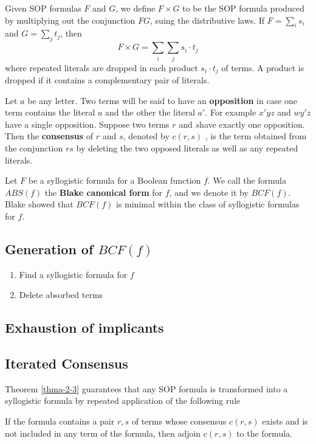 \documentclass[11pt]{article}
\begin{document}
Given SOP formulas \(F\) and \(G\), we define \(F\times G\) to be the SOP
formula produced by multiplying out the conjunction \(FG\), suing the
distributive laws. If \(F=\sum_is_i\) and \(G=\sum_jt_j\), then
\begin{equation*}
F\times G=\sum_i\sum_js_i\cdot t_j
\end{equation*}
where repeated literals are dropped in each product \(s_i\cdot t_j\) of
terms. A product is dropped if it contains a complementary pair of literals.

Let \(a\) be any letter. Two terms will be said to have an \textbf{opposition} in case
one term contains the literal \(a\) and the other the literal \(a'\). For
example \(x'yz\) and \(wy'z\) have a single opposition. Suppose two
terms \(r\) and \(s\)have exactly one opposition. Then the \textbf{consensus} of \(r\)
and \(s\), denoted by \(c(r,s)\) , is the term obtained from the
conjunction \(rs\) by deleting the two opposed literals as well as any
repeated literals.

Let \(F\) be a syllogistic formula for a Boolean function \(f\). We call the
formula \(ABS(f)\) the \textbf{Blake canonical form} for \(f\), and we denote it by \(BCF(f)\).
Blake showed that \(BCF(f)\) is minimal within the class of syllogistic
formulas for \(f\).
\subsection{Generation of \(BCF(f)\)}
\label{sec:org1bf05a5}
\begin{enumerate}
\item Find a syllogistic formula for \(f\)
\item Delete absorbed terms
\end{enumerate}
\subsection{Exhaustion of implicants}
\label{sec:orgd37b40b}
\subsection{Iterated Consensus}
\label{sec:org5befbfe}
Theorem \ref{thma-2-3} guarantees that any SOP formula is transformed into a
syllogistic formula by repeated application of the following rule
\begin{center}
If the formula contains a pair \(r,s\) of terms whose consensus \(c(r,s)\)
exists and is not included in any term of the formula, then adjoin \(c(r,s)\)
to the formula.
\end{center}
\end{document}

